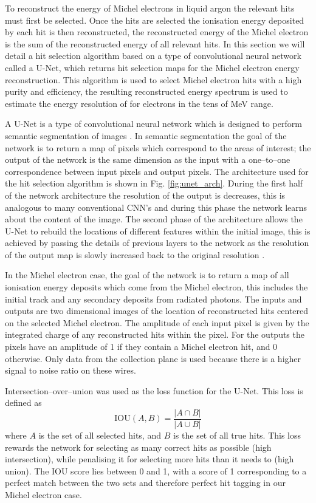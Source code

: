 To reconstruct the energy of Michel electrons in liquid argon the relevant hits
must first be selected. Once the hits are selected the ionisation energy
deposited by each hit is then reconstructed, the reconstructed energy of the 
Michel electron is the sum of the reconstructed energy of all relevant hits. In
this section we will detail a hit selection algorithm based on a type of
convolutional neural network called a U-Net, which returns hit selection maps 
for the Michel electron energy reconstruction. This algorithm is used to select 
Michel electron hits with a high purity and efficiency, the resulting 
reconstructed energy spectrum is used to estimate the energy resolution of 
\protodune{} for electrons in the tens of MeV range.

A U-Net is a type of convolutional neural network which is designed to perform
semantic segmentation of images \cite{TODO}. In semantic segmentation the goal
of the network is to return a map of pixels which correspond to the areas of 
interest; the output of the network is the same dimension as the input with a 
one--to--one correspondence between input pixels and output pixels. The
architecture used for the hit selection algorithm is shown in Fig.
\ref{fig:unet_arch}. During the first half of the network architecture the
resolution of the output is decreases, this is analogous to many conventional
CNN's and during this phase the network learns about the content of the image.
The second phase of the architecture allows the U-Net to rebuild the locations 
of different features within the initial image, this is achieved by passing 
the details of previous layers to the network as the resolution of the output 
map is slowly increased back to the original resolution \cite{TODO}.

In the Michel electron case, the goal of the network is to return a map of all
ionisation energy deposits which come from the Michel electron, this includes
the initial track and any secondary deposits from radiated photons. The inputs
and outputs are two dimensional images of the location of reconstructed hits
centered on the selected Michel electron. The amplitude of each input pixel is 
given by the integrated charge of any reconstructed hits within the pixel. For
the outputs the pixels have an amplitude of 1 if they contain a Michel electron
hit, and 0 otherwise. Only data from the collection plane is used because there 
is a higher signal to noise ratio on these wires. 

Intersection--over--union was used as the loss function for the U-Net. This loss
is defined as 
\begin{equation}
	\mbox{IOU}(A, B) = \frac{|A \cap B|}{|A \cup B|}
\end{equation}
where $A$ is the set of all selected hits, and $B$ is the set of all true hits.
This loss rewards the network for selecting as many correct hits as possible
(high intersection), while penalising it for selecting more hits than it needs
to (high union). The IOU score lies between 0 and 1, with a score of 1
corresponding to a perfect match between the two sets and therefore perfect hit
tagging in our Michel electron case.

